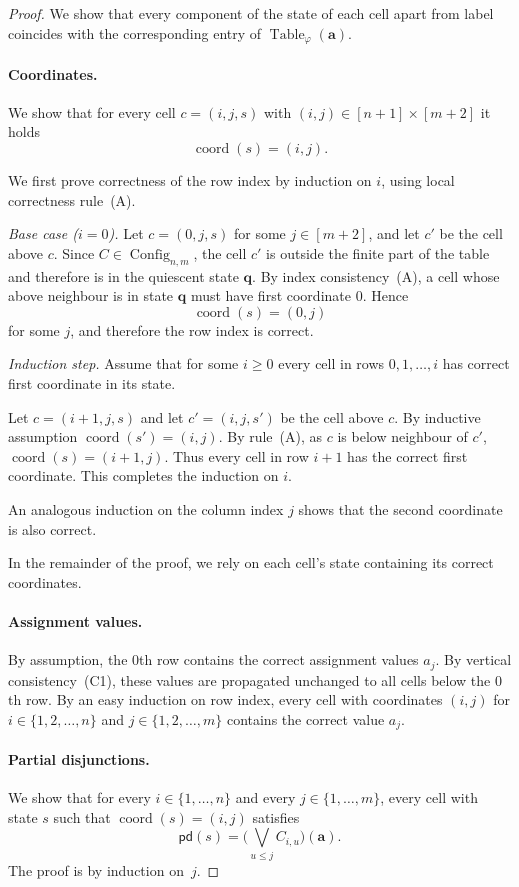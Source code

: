 \documentclass[10pt,a4paper]{amsart}
\DeclareMathOperator{\Config}{Config}
\DeclareMathOperator{\Table}{Table}
\DeclareMathOperator{\coord}{coord}
\newcommand{\tuple}{\mathbf}
\begin{document}
\begin{proof}
We show that every component of the state of each cell apart from label coincides with the corresponding entry
of $\Table_\varphi(\tuple a)$.

\paragraph{Coordinates.}
We show that for every cell $c=(i,j,s)$ with 
$(i,j)\in [n+1]\times[m+2]$ it holds
\[
\coord(s)=(i,j).
\]

We first prove correctness of the row index by induction on $i$,
using local correctness rule~(A).

\medskip
\noindent
\emph{Base case ($i=0$).}
Let $c=(0,j,s)$ for some $j\in[m+2]$, and let $c'$ be the cell above
$c$. Since $C\in\Config_{n,m}$, the cell $c'$ is outside the finite
part of the table and therefore is in the quiescent state $\tuple q$.
By index consistency~(A), a cell whose above neighbour is in state
$\tuple q$ must have first coordinate $0$. Hence
\[
\coord(s)=(0,j)
\]
for some $j$, and therefore the row index is correct.

\medskip
\noindent
\emph{Induction step.}
Assume that for some $i\ge 0$ every cell in rows $0, 1, \dots, i$ has correct
first coordinate in its state. 

Let $c=(i+1,j,s)$ and let $c'=(i,j,s')$ be the
cell above $c$.  By inductive assumption $\coord(s') = (i,j)$. By rule~(A), as $c$ is below neighbour of $c'$, $\coord(s) =(i+1, j)$. 
Thus every cell in row $i+1$ has the correct first coordinate.
This completes the induction on $i$.

An analogous induction on the column index $j$ shows that the second
coordinate is also correct. 

In the remainder of the proof, we rely on each cell’s state containing its correct coordinates.


\paragraph{Assignment values.}
By assumption, the $0$th row contains the correct assignment values $a_j$.
By vertical consistency~(C1), these values are propagated unchanged to all cells
below the $0$th row. By an easy induction on row index, every cell with coordinates $(i,j)$ for $i \in \{1, 2, \dots, n\}$ and $j \in \{1, 2, \dots, m\}$ contains the
correct value $a_j$.

\paragraph{Partial disjunctions.}
We show that for every $i\in\{1,\dots,n\}$ and every $j\in\{1,\dots,m\}$,
every cell with state $s$ such that $\coord(s)=(i,j)$ satisfies
\[
\mathsf{pd}(s)=\bigl(\bigvee_{u\le j} C_{i,u}\bigr)(\tuple a).
\]
The proof is by induction on~$j$.


\end{proof}
\end{document}

